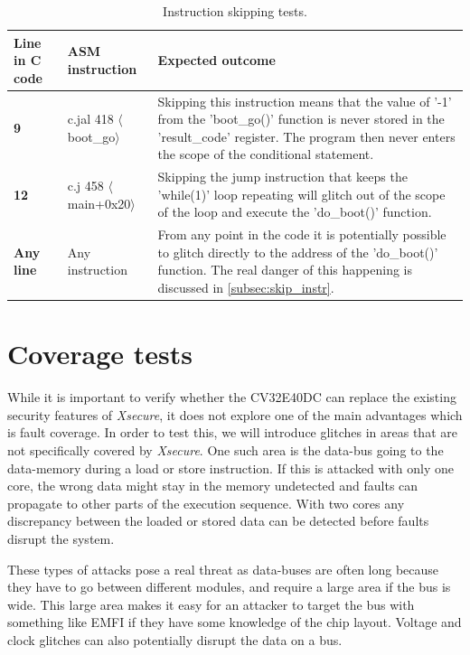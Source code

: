 \begin{table}[h]
\centering
\caption{Instruction skipping tests.}
\label{tab:instr_skip_test}
\begin{tabular}{m{2.5cm}m{3.5cm}m{7.5cm}}
\toprule 
Line in C code & ASM instruction & Expected outcome \\
\midrule
\rowcolor{black!20} \textbf{9} & c.jal 418 $\langle$boot\_go$\rangle$ & Skipping this instruction means that the value of '-1' from the 'boot\_go()' function is never stored in the 'result\_code' register. The program then never enters the scope of the conditional statement. \\
\textbf{12} & c.j 458 $\langle$main+0x20$\rangle$ & Skipping the jump instruction that keeps the 'while(1)' loop repeating will glitch out of the scope of the loop and execute the 'do\_boot()' function.  \\
\rowcolor{black!20} \textbf{Any line} & Any instruction & From any point in the code it is potentially possible to glitch directly to the address of the 'do\_boot()' function. The real danger of this happening is discussed in \autoref{subsec:skip_instr}. \\
\bottomrule
\end{tabular}
\end{table}

\section{Coverage tests}
\label{sec:coverage_test}

While it is important to verify whether the CV32E40DC can replace the existing security features of \textit{Xsecure}, it does not explore one of the main advantages which is fault coverage. In order to test this, we will introduce glitches in areas that are not specifically covered by \textit{Xsecure}. One such area is the data-bus going to the data-memory during a load or store instruction. If this is attacked with only one core, the wrong data might stay in the memory undetected and faults can propagate to other parts of the execution sequence. With two cores any discrepancy between the loaded or stored data can be detected before faults disrupt the system. 

These types of attacks pose a real threat as data-buses are often long because they have to go between different modules, and require a large area if the bus is wide. This large area makes it easy for an attacker to target the bus with something like EMFI if they have some knowledge of the chip layout. Voltage and clock glitches can also potentially disrupt the data on a bus. 

